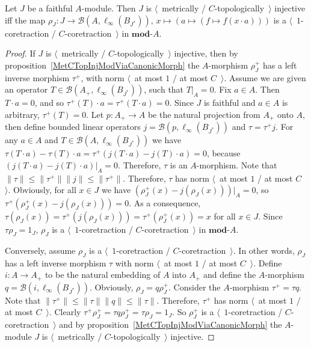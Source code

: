 \begin{proposition}\label{NonDegenMetTopInjCharac}  Let $J$ be a faithful
$A$-module. Then $J$ is $\langle$~metrically / $C$-topologically~$\rangle$
injective iff the map
$\rho_J:J\to\mathcal{B}(A,\ell_\infty(B_{J^*})),\, x\mapsto(a\mapsto(f\mapsto
f(x\cdot a)))$ is a $\langle$~$1$-coretraction / $C$-coretraction~$\rangle$ in
$\mathbf{mod}\text{-}A$.
\end{proposition} 
\begin{proof}
If $J$ is $\langle$~metrically / $C$-topologically~$\rangle$ injective, then by
proposition~\ref{MetCTopInjModViaCanonicMorph} the $A$-morphism $\rho_J^+$ has a 
left inverse morphism $\tau^+$, with norm $\langle$~at most $1$ / at most
$C$~$\rangle$. Assume we are given an operator $T\in
\mathcal{B}(A_+,\ell_\infty(B_{J^*}))$, such that $T|_A=0$. Fix $a\in A$. Then
$T\cdot a=0$, and so $\tau^+(T)\cdot a=\tau^+(T\cdot a)=0$. Since $J$ is
faithful and $a\in A$ is arbitrary, $\tau^+(T)=0$. Let $p:A_+\to A$ be
the natural projection from $A_+$ onto $A$, then define bounded linear operators
$j=\mathcal{B}(p,\ell_\infty(B_{J^*}))$ and $\tau =\tau^+ j$. For any $a\in A$
and $T\in\mathcal{B}(A,\ell_\infty(B_{J^*}))$ 
we have $\tau (T\cdot a)-\tau (T)\cdot a=\tau^+(j(T\cdot a)-j(T)\cdot a)=0$, 
because $(j(T\cdot a)-j(T)\cdot a)|_A=0$. Therefore, $\tau $ is an $A$-morphism. 
Note that $\lVert\tau \rVert\leq\lVert\tau^+\rVert\lVert j\rVert\leq\lVert\tau^+\rVert$.
Therefore, $\tau$ has norm $\langle$~at most $1$ / at most $C$~$\rangle$. 
Obviously, for all $x\in J$ we have $(\rho_J^+(x)-j(\rho_J(x)))|_A=0$, 
so $\tau^+(\rho_J^+(x)-j(\rho_J(x)))=0$. 
As a consequence, $\tau (\rho_J(x))=\tau^+(j(\rho_J(x)))=\tau^+(\rho_J^+(x))=x$ 
for all $x\in J$. Since $\tau \rho_J=1_J$, $\rho_J$ 
is a  $\langle$~$1$-coretraction / $C$-coretraction~$\rangle$ 
in $\mathbf{mod}\text{-}A$.

Conversely, assume $\rho_J$ is a $\langle$~$1$-coretraction /
$C$-coretraction~$\rangle$. In other words, $\rho_J$ has a left inverse 
morphism $\tau $ with norm $\langle$~at most $1$ / at most $C$~$\rangle$. 
Define $i:A\to A_+$ to be the natural embedding of $A$ into $A_+$ and 
define the $A$-morphism $q=\mathcal{B}(i,\ell_\infty(B_{J^*}))$. 
Obviously, $\rho_J=q\rho_J^+$. Consider the $A$-morphism $\tau^+=\tau q$. 
Note that $\lVert\tau^+\rVert\leq\lVert\tau \rVert\lVert q\rVert\leq \lVert\tau \rVert$.
Therefore, $\tau^+$ has norm $\langle$~at most $1$ / at most $C$~$\rangle$. 
Clearly $\tau^+\rho_J^+=\tau q\rho_J^+=\tau \rho_J=1_J$. So $\rho_J^+$ 
is a $\langle$~$1$-coretraction / $C$-coretraction~$\rangle$ and by 
proposition~\ref{MetCTopInjModViaCanonicMorph} the $A$-module $J$ is
$\langle$~metrically / $C$-topologically~$\rangle$ injective.
\end{proof}

